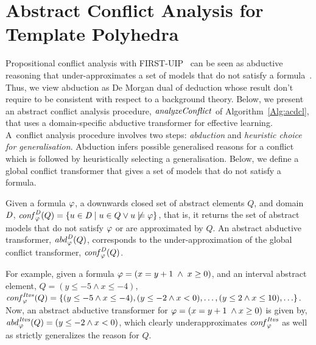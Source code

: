 \section{Abstract Conflict Analysis for Template Polyhedra}\label{sec:conflict}
%
Propositional conflict analysis with FIRST-UIP~\cite{cdcl} can be seen as
abductive reasoning that under-approximates a set of models that do not
satisfy a formula~\cite{sas12,dhk2013-popl}.  Thus, we view abduction as 
De Morgan dual of deduction whose result don't require to be consistent with respect
to a background theory.  Below, we present an abstract
conflict analysis procedure, $\mathit{analyzeConflict}$ of
Algorithm~\ref{Alg:acdcl}, that uses a domain-specific abductive transformer
for effective learning.  A~conflict analysis procedure involves two steps:
{\em abduction} and {\em heuristic choice for generalisation}.  Abduction
infers possible generalised reasons for a conflict which is followed by
heuristically selecting a generalisation.  Below, we define a global 
conflict transformer that gives a set of models that do not satisfy a 
formula.  
\begin{definition}
  Given a formula $\varphi$, a downwards closed set of abstract elements $Q$,
  and domain $\mathit{D}$, $\mathit{conf}_{\varphi}^{\mathit{D}}(Q) = \{u \in \mathit{D} \mid u \in
  Q \vee u \not\models \varphi \}$, that is, it returns 
  the set of abstract models that do not satisfy $\varphi$ or are approximated by 
  $Q$.  An abstract abductive transformer, $\mathit{abd}_{\varphi}^{\mathit{D}}(Q)$, corresponds to 
  the under-approximation of the global conflict transformer,
  $\mathit{conf}_{\varphi}^{\mathit{D}}(Q)$.  
\end{definition}
%
%
For example, given a formula $\varphi=(x=y+1\; \wedge\; x\geq 0)$, and an interval 
abstract element, $Q=(y\leq-5 \wedge x \leq -4)$, 
$\mathit{conf}_{\varphi}^{\mathit{Itvs}}(Q) = \{(y\leq-5 \land x \leq -4), 
(y \leq -2 \land x < 0), \ldots, (y \leq 2 \land x \leq 10), \ldots \}$.  
%
Now, an abstract abductive transformer for $\varphi=(x=y+1\; \wedge x \geq 0)$ 
is given by, $\mathit{abd}_{\varphi}^{\mathit{Itvs}}(Q)=(y \leq -2 \land x < 0)$, 
which clearly underapproximates $\mathit{conf}_{\varphi}^{\mathit{Itvs}}$ as well as 
strictly generalizes the reason for $Q$. 
%


